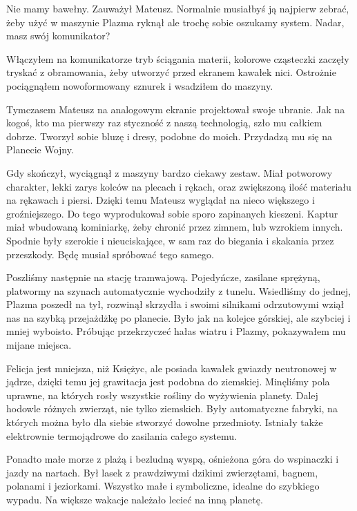 \begin{dialogue}
\ds{} Nie mamy bawełny. \dm{} Zauważył Mateusz.
\ds{} Normalnie musiałbyś ją najpierw zebrać, żeby użyć w maszynie \dm{} Plazma ryknął \dm{} ale trochę sobie oszukamy system.
Nadar, masz swój komunikator?
\end{dialogue}

Włączyłem na komunikatorze tryb ściągania materii, kolorowe cząsteczki zaczęły tryskać z obramowania, żeby utworzyć przed ekranem kawałek nici.
Ostrożnie pociągnąłem nowoformowany sznurek i wsadziłem do maszyny. 

Tymczasem Mateusz na analogowym ekranie projektował swoje ubranie. 
Jak na kogoś, kto ma pierwszy raz styczność z naszą technologią, szło mu całkiem dobrze.
Tworzył sobie bluzę i dresy, podobne do moich. Przydadzą mu się na Planecie Wojny.

Gdy skończył, wyciągnął z maszyny bardzo ciekawy zestaw. Miał potworowy charakter, lekki zarys kolców na plecach i rękach, oraz zwiększoną ilość materiału na rękawach i piersi.
Dzięki temu Mateusz wyglądał na nieco większego i groźniejszego.
Do tego wyprodukował sobie sporo zapinanych kieszeni. 
Kaptur miał wbudowaną kominiarkę, żeby chronić przez zimnem, lub wzrokiem innych.
Spodnie były szerokie i nieuciskające, w sam raz do biegania i skakania przez przeszkody. Będę musiał spróbować tego samego.

Poszliśmy następnie na stację tramwajową. Pojedyńcze, zasilane sprężyną, platwormy na szynach automatycznie wychodziły z tunelu.
Wsiedliśmy do jednej, Plazma poszedł na tył, rozwinął skrzydła i swoimi silnikami odrzutowymi wziął nas na szybką przejażdżkę po planecie.
Było jak na kolejce górskiej, ale szybciej i mniej wyboisto.
Próbując przekrzyczeć hałas wiatru i Plazmy, pokazywałem mu mijane miejsca.

Felicja jest mniejsza, niż Księżyc, ale posiada kawałek gwiazdy neutronowej w jądrze, dzięki temu jej grawitacja jest podobna do ziemskiej.
Minęliśmy pola uprawne, na których rosły wszystkie rośliny do wyżywienia planety.
Dalej hodowle różnych zwierząt, nie tylko ziemskich.
Były automatyczne fabryki, na których można było dla siebie stworzyć dowolne przedmioty.
Istniały także elektrownie termojądrowe do zasilania całego systemu.

Ponadto małe morze z plażą i bezludną wyspą, ośnieżona góra do wspinaczki i jazdy na nartach.
Był lasek z prawdziwymi dzikimi zwierzętami, bagnem, polanami i jeziorkami.
Wszystko małe i symboliczne, idealne do szybkiego wypadu.
Na większe wakacje należało lecieć na inną planetę.

